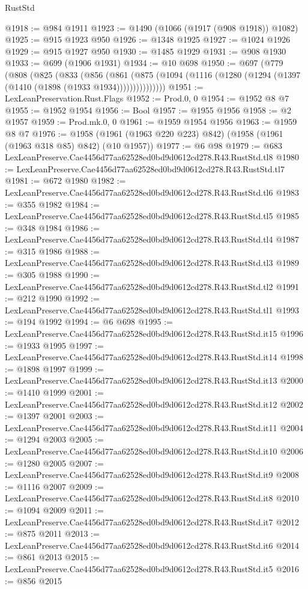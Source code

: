 \begin{lexlean}{RustStd}
\begin{coremodule}
@1918 := @984 @1911
@1923 := @1490 (@1066 (@1917 (@908 @1918)) @1082)
@1925 := @915 @1923 @950
@1926 := @1348 @1925
@1927 := @1024 @1926
@1929 := @915 @1927 @950
@1930 := @1485 @1929
@1931 := @908 @1930
@1933 := @699 (@1906 @1931)
@1934 := @10 @698
@1950 := @697
    (@779
      (@808
        (@825
          (@833
            (@856
              (@861
                (@875 (@1094 (@1116 (@1280 (@1294 (@1397 (@1410 (@1898 (@1933 @1934)))))))))))))))
@1951 := LexLeanPreservation.Rust.Flags
@1952 := Prod.{0, 0}
@1954 := @1952 @8 @7
@1955 := @1952 @1954
@1956 := Bool
@1957 := @1955 @1956
@1958 := @2 @1957
@1959 := Prod.mk.{0, 0}
@1961 := @1959 @1954 @1956
@1963 := @1959 @8 @7
@1976 := @1958 (@1961 (@1963 @220 @223) @842) (@1958 (@1961 (@1963 @318 @85) @842) (@10 @1957))
@1977 := @6 @98
@1979 := @683 LexLeanPreserve.Cae4456d77aa62528ed0bd9d0612cd278.R43.RustStd.tl8
@1980 := LexLeanPreserve.Cae4456d77aa62528ed0bd9d0612cd278.R43.RustStd.tl7
@1981 := @672 @1980
@1982 := LexLeanPreserve.Cae4456d77aa62528ed0bd9d0612cd278.R43.RustStd.tl6
@1983 := @355 @1982
@1984 := LexLeanPreserve.Cae4456d77aa62528ed0bd9d0612cd278.R43.RustStd.tl5
@1985 := @348 @1984
@1986 := LexLeanPreserve.Cae4456d77aa62528ed0bd9d0612cd278.R43.RustStd.tl4
@1987 := @315 @1986
@1988 := LexLeanPreserve.Cae4456d77aa62528ed0bd9d0612cd278.R43.RustStd.tl3
@1989 := @305 @1988
@1990 := LexLeanPreserve.Cae4456d77aa62528ed0bd9d0612cd278.R43.RustStd.tl2
@1991 := @212 @1990
@1992 := LexLeanPreserve.Cae4456d77aa62528ed0bd9d0612cd278.R43.RustStd.tl1
@1993 := @194 @1992
@1994 := @6 @698
@1995 := LexLeanPreserve.Cae4456d77aa62528ed0bd9d0612cd278.R43.RustStd.it15
@1996 := @1933 @1995
@1997 := LexLeanPreserve.Cae4456d77aa62528ed0bd9d0612cd278.R43.RustStd.it14
@1998 := @1898 @1997
@1999 := LexLeanPreserve.Cae4456d77aa62528ed0bd9d0612cd278.R43.RustStd.it13
@2000 := @1410 @1999
@2001 := LexLeanPreserve.Cae4456d77aa62528ed0bd9d0612cd278.R43.RustStd.it12
@2002 := @1397 @2001
@2003 := LexLeanPreserve.Cae4456d77aa62528ed0bd9d0612cd278.R43.RustStd.it11
@2004 := @1294 @2003
@2005 := LexLeanPreserve.Cae4456d77aa62528ed0bd9d0612cd278.R43.RustStd.it10
@2006 := @1280 @2005
@2007 := LexLeanPreserve.Cae4456d77aa62528ed0bd9d0612cd278.R43.RustStd.it9
@2008 := @1116 @2007
@2009 := LexLeanPreserve.Cae4456d77aa62528ed0bd9d0612cd278.R43.RustStd.it8
@2010 := @1094 @2009
@2011 := LexLeanPreserve.Cae4456d77aa62528ed0bd9d0612cd278.R43.RustStd.it7
@2012 := @875 @2011
@2013 := LexLeanPreserve.Cae4456d77aa62528ed0bd9d0612cd278.R43.RustStd.it6
@2014 := @861 @2013
@2015 := LexLeanPreserve.Cae4456d77aa62528ed0bd9d0612cd278.R43.RustStd.it5
@2016 := @856 @2015

\end{coremodule}
\end{lexlean}
